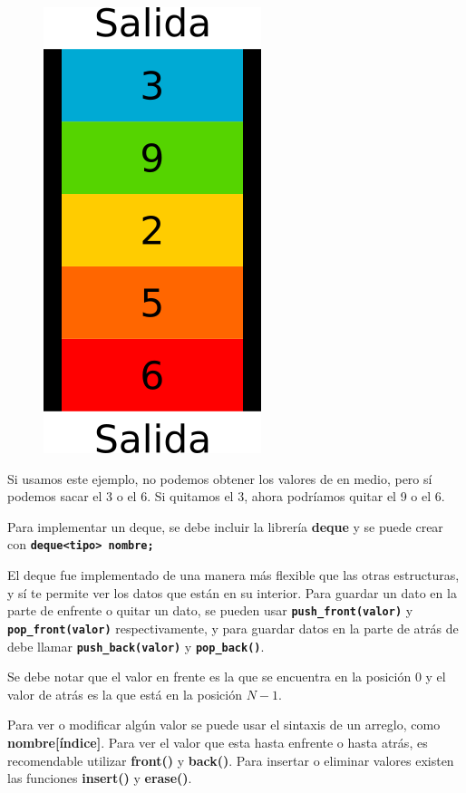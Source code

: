 \documentclass{article}
\begin{document}
\begin{figure}[H]
    \centering
    \includegraphics[width=0.1\paperwidth]{deque}
\end{figure}

Si usamos este ejemplo, no podemos obtener los valores de en medio, pero sí podemos sacar el 3 o el 6. Si quitamos el 3, ahora podríamos quitar el 9 o el 6.

Para implementar un deque, se debe incluir la librería \textbf{deque} y se puede crear con \textbf{\lstinline{deque<tipo> nombre;}}

El deque fue implementado de una manera más flexible que las otras estructuras, y sí te permite ver los datos que están en su interior. Para guardar un dato en la parte de enfrente o quitar un dato, se pueden usar \textbf{\lstinline{push_front(valor)}} y \textbf{\lstinline{pop_front(valor)}} respectivamente, y para guardar datos en la parte de atrás de debe llamar \textbf{\lstinline{push_back(valor)}} y \textbf{\lstinline{pop_back()}}.

Se debe notar que el valor en frente es la que se encuentra en la posición 0 y el valor de atrás es la que está en la posición $N - 1$.

Para ver o modificar algún valor se puede usar el sintaxis de un arreglo, como \textbf{nombre[índice]}. Para ver el valor que esta hasta enfrente o hasta atrás, es recomendable utilizar \textbf{front()} y \textbf{back()}. Para insertar o eliminar valores existen las funciones \textbf{insert()} y \textbf{erase()}.
\end{document}
